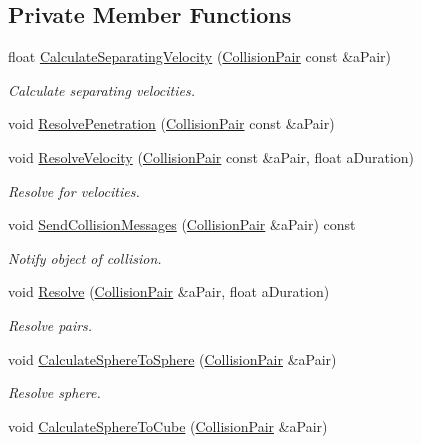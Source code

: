 \subsection*{Private Member Functions}
\begin{DoxyCompactItemize}
\item 
float \hyperlink{classResolver_ae31949701a0279514220c8a7458a62ff}{Calculate\+Separating\+Velocity} (\hyperlink{structCollisionPair}{Collision\+Pair} const \&a\+Pair)
\begin{DoxyCompactList}\small\item\em Calculate separating velocities. \end{DoxyCompactList}\item 
void \hyperlink{classResolver_a963388770cc259e54f295385d44a9be2}{Resolve\+Penetration} (\hyperlink{structCollisionPair}{Collision\+Pair} const \&a\+Pair)
\item 
void \hyperlink{classResolver_afbe8f522c75487cfb41cd631f87ece33}{Resolve\+Velocity} (\hyperlink{structCollisionPair}{Collision\+Pair} const \&a\+Pair, float a\+Duration)
\begin{DoxyCompactList}\small\item\em Resolve for velocities. \end{DoxyCompactList}\item 
void \hyperlink{classResolver_a5eb41265a563926cd780f0efd3759ae2}{Send\+Collision\+Messages} (\hyperlink{structCollisionPair}{Collision\+Pair} \&a\+Pair) const 
\begin{DoxyCompactList}\small\item\em Notify object of collision. \end{DoxyCompactList}\item 
void \hyperlink{classResolver_a7c373ef170f07e9f0333ebf903ca7ece}{Resolve} (\hyperlink{structCollisionPair}{Collision\+Pair} \&a\+Pair, float a\+Duration)
\begin{DoxyCompactList}\small\item\em Resolve pairs. \end{DoxyCompactList}\item 
void \hyperlink{classResolver_ad460715037be4c30721adfebe3a9218c}{Calculate\+Sphere\+To\+Sphere} (\hyperlink{structCollisionPair}{Collision\+Pair} \&a\+Pair)
\begin{DoxyCompactList}\small\item\em Resolve sphere. \end{DoxyCompactList}\item 
void \hyperlink{classResolver_a66c94d8c166faedbf0cbe6f707c54501}{Calculate\+Sphere\+To\+Cube} (\hyperlink{structCollisionPair}{Collision\+Pair} \&a\+Pair)

\end{DoxyCompactItemize}
